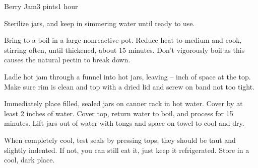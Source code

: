 \documentclass[../Cookbook.tex]{subfiles}
\begin{document}
\begin{recipe}{Berry Jam}{3 pints}{1 hour}

Sterilize jars, and keep in simmering water until ready to use.

Bring to a boil in a large nonreactive pot. Reduce heat to medium and cook, stirring often, until thickened, about 15 minutes. Don't vigorously boil as this causes the natural pectin to break down.

Ladle hot jam through a funnel into hot jars, leaving -- inch of space at the top. Make sure rim is clean and top with a dried lid and screw on band not too tight.

Immediately place filled, sealed jars on canner rack in hot water. Cover by at least 2 inches of water. Cover top, return water to boil, and process for 15 minutes. %
Lift jars out of water with tongs and space on towel to cool and dry.

When completely cool, test seals by pressing tops; they should be taut and slightly indented. If not, you can still eat it, just keep it refrigerated. Store in a cool, dark place.

\end{recipe}
\end{document}
